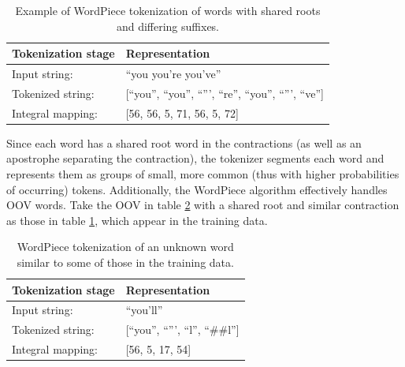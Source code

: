 \documentclass[12pt]{article}
\begin{document}
\begin{table}[h!]
    \centering
    \begin{tabular}{l l}
        \toprule
        Tokenization stage & Representation                                            \\
        \midrule
        Input string:      & ``you you're you've''                                     \\
        Tokenized string:  & [``you'', ``you'', ``''', ``re'', ``you'', ``''', ``ve''] \\
        Integral mapping:  & [56, 56, 5, 71, 56, 5, 72]                                \\
        \bottomrule
    \end{tabular}
    \caption{Example of WordPiece tokenization of words with shared roots and differing suffixes.}
    \label{tab:wordpiece_tokenization_shared_roots_example}
\end{table}

\noindent
Since each word has a shared root word in the contractions (as well as an apostrophe separating the contraction), the tokenizer segments each word and
represents them as groups of small, more common (thus with higher probabilities of occurring) tokens. Additionally, the WordPiece algorithm
effectively handles OOV words. Take the OOV in table \ref{tab:wordpiece_unk_word_similar} with a shared root and similar contraction as those in table
\ref{tab:wordpiece_tokenization_shared_roots_example}, which appear in the training data.

\begin{table}[h!]
    \centering
    \begin{tabular}{l l}
        \toprule
        Tokenization stage & Representation                     \\
        \midrule
        Input string:      & ``you'll''                         \\
        Tokenized string:  & [``you'', ``''', ``l'', ``\#\#l''] \\
        Integral mapping:  & [56, 5, 17, 54]                    \\
        \bottomrule
    \end{tabular}
    \caption{WordPiece tokenization of an unknown word similar to some of those in the training data.}
    \label{tab:wordpiece_unk_word_similar}
\end{table}
\end{document}
